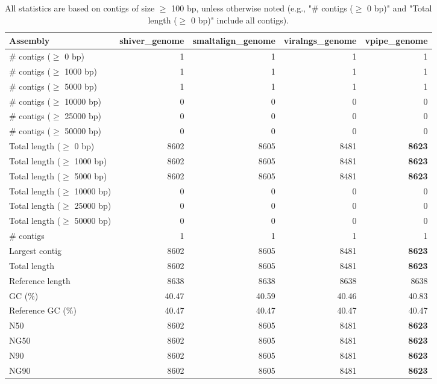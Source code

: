 \documentclass[12pt,a4paper]{article}
\begin{document}
\begin{table}[ht]
\begin{center}
\caption{All statistics are based on contigs of size $\geq$ 100 bp, unless otherwise noted (e.g., "\# contigs ($\geq$ 0 bp)" and "Total length ($\geq$ 0 bp)" include all contigs).}
\begin{tabular}{|l*{4}{|r}|}
\hline
Assembly & shiver\_genome & smaltalign\_genome & viralngs\_genome & vpipe\_genome \\ \hline
\# contigs ($\geq$ 0 bp) & 1 & 1 & 1 & 1 \\ \hline
\# contigs ($\geq$ 1000 bp) & 1 & 1 & 1 & 1 \\ \hline
\# contigs ($\geq$ 5000 bp) & 1 & 1 & 1 & 1 \\ \hline
\# contigs ($\geq$ 10000 bp) & 0 & 0 & 0 & 0 \\ \hline
\# contigs ($\geq$ 25000 bp) & 0 & 0 & 0 & 0 \\ \hline
\# contigs ($\geq$ 50000 bp) & 0 & 0 & 0 & 0 \\ \hline
Total length ($\geq$ 0 bp) & 8602 & 8605 & 8481 & {\bf 8623} \\ \hline
Total length ($\geq$ 1000 bp) & 8602 & 8605 & 8481 & {\bf 8623} \\ \hline
Total length ($\geq$ 5000 bp) & 8602 & 8605 & 8481 & {\bf 8623} \\ \hline
Total length ($\geq$ 10000 bp) & 0 & 0 & 0 & 0 \\ \hline
Total length ($\geq$ 25000 bp) & 0 & 0 & 0 & 0 \\ \hline
Total length ($\geq$ 50000 bp) & 0 & 0 & 0 & 0 \\ \hline
\# contigs & 1 & 1 & 1 & 1 \\ \hline
Largest contig & 8602 & 8605 & 8481 & {\bf 8623} \\ \hline
Total length & 8602 & 8605 & 8481 & {\bf 8623} \\ \hline
Reference length & 8638 & 8638 & 8638 & 8638 \\ \hline
GC (\%) & 40.47 & 40.59 & 40.46 & 40.83 \\ \hline
Reference GC (\%) & 40.47 & 40.47 & 40.47 & 40.47 \\ \hline
N50 & 8602 & 8605 & 8481 & {\bf 8623} \\ \hline
NG50 & 8602 & 8605 & 8481 & {\bf 8623} \\ \hline
N90 & 8602 & 8605 & 8481 & {\bf 8623} \\ \hline
NG90 & 8602 & 8605 & 8481 & {\bf 8623} \\ \hline

\end{tabular}
\end{center}
\end{table}
\end{document}
